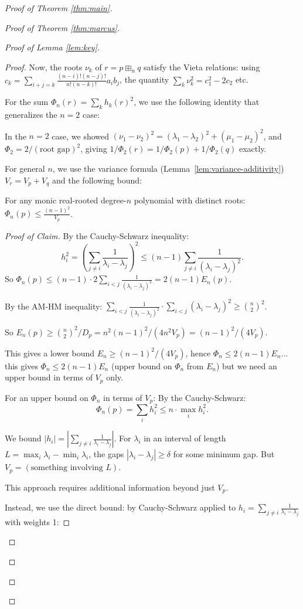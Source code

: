 \documentclass[12pt]{article}
\theoremstyle{definition}
\begin{document}
\begin{proof}[Proof of Theorem \ref{thm:main}]
\begin{proof}[Proof of Theorem \ref{thm:marcus}]
\begin{proof}[Proof of Lemma \ref{lem:key}]
\begin{proof}
Now, the roots $\nu_k$ of $r = p\boxplus_n q$ satisfy the Vieta relations: using $c_k = \sum_{i+j=k}\frac{(n-i)!(n-j)!}{n!(n-k)!}a_ib_j$, the quantity $\sum_k\nu_k^2 = c_1^2-2c_2$ etc.

For the sum $\Phi_n(r) = \sum_k h_k(r)^2$, we use the following identity that generalizes the $n=2$ case:

In the $n=2$ case, we showed $(\nu_1-\nu_2)^2 = (\lambda_1-\lambda_2)^2+(\mu_1-\mu_2)^2$, and $\Phi_2 = 2/(\text{root gap})^2$, giving $1/\Phi_2(r) = 1/\Phi_2(p)+1/\Phi_2(q)$ exactly.

For general $n$, we use the variance formula (Lemma~\ref{lem:variance-additivity}) $V_r = V_p+V_q$ and the following bound:

\begin{claim}
For any monic real-rooted degree-$n$ polynomial with distinct roots: $\Phi_n(p)\leq\frac{(n-1)^2}{V_p}$.
\end{claim}

\begin{proof}[Proof of Claim]
By the Cauchy-Schwarz inequality:
$$h_i^2 = \left(\sum_{j\neq i}\frac{1}{\lambda_i-\lambda_j}\right)^2\leq(n-1)\sum_{j\neq i}\frac{1}{(\lambda_i-\lambda_j)^2}.$$
So $\Phi_n(p)\leq(n-1)\cdot 2\sum_{i<j}\frac{1}{(\lambda_i-\lambda_j)^2} = 2(n-1)E_n(p)$.

By the AM-HM inequality: $\sum_{i<j}\frac{1}{(\lambda_i-\lambda_j)^2}\cdot\sum_{i<j}(\lambda_i-\lambda_j)^2\geq\binom{n}{2}^2$.

So $E_n(p) \geq \binom{n}{2}^2/D_p = n^2(n-1)^2/(4n^2 V_p) = (n-1)^2/(4V_p)$.

This gives a lower bound $E_n\geq(n-1)^2/(4V_p)$, hence $\Phi_n\leq 2(n-1)E_n$... this gives $\Phi_n\leq 2(n-1)E_n$ (upper bound on $\Phi_n$ from $E_n$) but we need an upper bound in terms of $V_p$ only.

For an upper bound on $\Phi_n$ in terms of $V_p$: By the Cauchy-Schwarz:
$$\Phi_n(p) = \sum_i h_i^2\leq n\cdot\max_i h_i^2.$$

We bound $|h_i| = |\sum_{j\neq i}\frac{1}{\lambda_i-\lambda_j}|$. For $\lambda_i$ in an interval of length $L = \max_i\lambda_i-\min_i\lambda_i$, the gaps $|\lambda_i-\lambda_j|\geq \delta$ for some minimum gap. But $V_p = (\text{something involving }L)$.

This approach requires additional information beyond just $V_p$.

Instead, we use the direct bound: by Cauchy-Schwarz applied to $h_i = \sum_{j\neq i}\frac{1}{\lambda_i-\lambda_j}$ with weights 1:


\end{proof}
\end{proof}
\end{proof}
\end{proof}
\end{proof}
\end{document}
